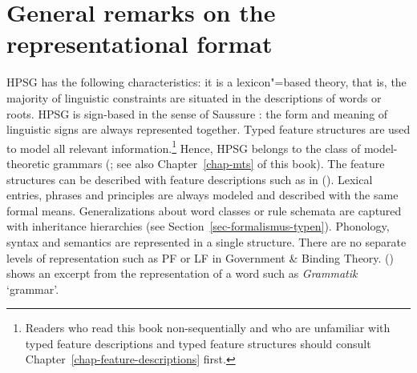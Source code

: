 \section{General remarks on the representational format}

HPSG has the following characteristics: it is a lexicon"=based theory, that is, the majority of
linguistic constraints are situated in the descriptions of words or roots. HPSG is sign-based in the
sense of Saussure \citeyearpar{Saussure16a-En}: the form and meaning of
linguistic signs are always represented together. Typed feature structures are used to model all
relevant information.\footnote{%
  Readers who read this book non-sequentially and who are unfamiliar with typed feature descriptions
  and typed feature structures should consult Chapter~\ref{chap-feature-descriptions} first.
} Hence, HPSG belongs to the class of model-theoretic grammars (\citealp{King99a-u}; see also Chapter~\ref{chap-mts} of this book). The feature
structures can be described with feature descriptions such as in (). Lexical entries, phrases
and principles are always modeled and described with the same formal means.  Generalizations about
word classes or rule schemata are captured with inheritance hierarchies (see
Section~\ref{sec-formalismus-typen}). Phonology, syntax and semantics are represented in a single
structure. There are no separate levels of representation such as PF or LF in Government \& Binding
Theory.  () shows an excerpt from the representation of a word such as \emph{Grammatik} `grammar'.

